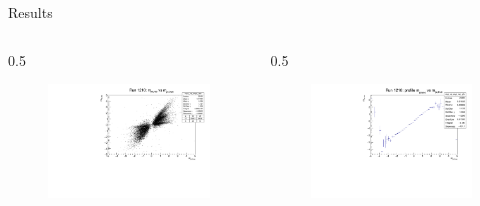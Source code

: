 \documentclass{beamer}[10pt]
\begin{document}
\begin{frame}{Results}
  \vspace{-3mm}
  \begin{columns}
    \begin{column}{0.5\framewidth}
      \begin{figure}[H]
        \centering
        \includegraphics[width= \textwidth]{figures/pdf/myz_vs_myz_rec.pdf}
        \label{fig:enter-label}
    \end{figure}
    
    \end{column}
    \begin{column}{0.5\framewidth}
     
      \begin{figure}[H]
        \centering
        \includegraphics[width= \textwidth]{figures/pdf/myz_vs_myz_rec_prof.pdf}
        \label{fig:enter-label}
    \end{figure}
    \end{column}
  \end{columns}
\end{frame}
\end{document}
